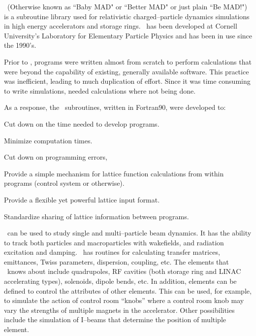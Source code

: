 
\bmad\ (Otherwise known as ``Baby MAD" or ``Better MAD" or just plain
``Be MAD!")  is a subroutine library used for relativistic
charged--particle dynamics simulations in high energy accelerators and
storage rings. \bmad\ has been developed at Cornell University's
Laboratory for Elementary Particle Physics and has been in use since
the 1990's. 

Prior to \bmad, programs were written almost from scratch to perform
calculations that were beyond the capability of existing, generally
available software. This practice was inefficient, leading to much
duplication of effort.  Since it was time consuming to write
simulations, needed calculations where not being done.

As a response, the \bmad\ subroutines, written in
Fortran90, were developed to:
\begin{Itemize}
\item Cut down on the time needed to develop programs.
\item Minimize computation times.
\item Cut down on programming errors, 
\item Provide a simple mechanism for lattice function calculations
from within programs (control system or otherwise).
\item Provide a flexible yet powerful lattice input format.
\item Standardize sharing of lattice information between 
programs.
\end{Itemize}

\bmad\ can be used to study single and multi--particle beam dynamics.
It has the ability to track both particles and macroparticles with
wakefields, and radiation excitation and damping. \bmad\ has routines
for calculating transfer matrices, emittances, Twiss parameters,
dispersion, coupling, etc. The elements that \bmad\ knows about
include quadrupoles, RF cavities (both storage ring and LINAC
accelerating types), solenoids, dipole bends, etc. In addition,
elements can be defined to control the attributes of other
elements. This can be used, for example, to simulate the action of
control room ``knobs'' where a control room knob may vary the
strengths of multiple magnets in the accelerator. Other possibilities
include the simulation of I--beams that determine the position of
multiple element.

\vfill
\break

